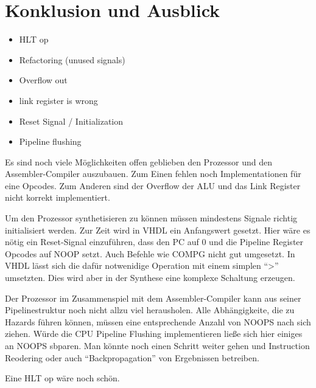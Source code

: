 \documentclass[paper=a4,fontsize=12pt,twocolumn]{scrreprt}
\begin{document}
\chapter{Konklusion und Ausblick}
\begin{itemize}
    \item HLT op
    \item Refactoring (unused signals)
    \item Overflow out
    \item link register is wrong
    \item Reset Signal / Initialization
    \item Pipeline flushing
\end{itemize}


Es sind noch viele Möglichkeiten offen geblieben den Prozessor und den Assembler-Compiler auszubauen.
Zum Einen fehlen noch Implementationen für eine Opcodes.
Zum Anderen sind der Overflow der ALU und das Link Register nicht korrekt implementiert.

Um den Prozessor synthetisieren zu können müssen mindestens Signale richtig initialisiert werden.
Zur Zeit wird in VHDL ein Anfangswert gesetzt.
Hier wäre es nötig ein Reset-Signal einzuführen, dass den PC auf 0 und die Pipeline Register Opcodes auf NOOP setzt.
Auch Befehle wie COMPG nicht gut umgesetzt.
In VHDL lässt sich die dafür notwenidige Operation mit einem simplen \enquote{>} umsetzten.
Dies wird aber in der Synthese eine komplexe Schaltung erzeugen.

Der Prozessor im Zusammenspiel mit dem Assembler-Compiler kann aus seiner Pipelinestruktur noch nicht allzu viel herausholen.
Alle Abhängigkeite, die zu Hazards führen können, müssen eine entsprechende Anzahl von NOOPS nach sich ziehen.
Würde die CPU Pipeline Flushing implementieren ließe sich hier einiges an NOOPS sbparen.
Man könnte noch einen Schritt weiter gehen und Instruction Reodering oder auch \enquote{Backpropagation} von Ergebnissen betreiben.

Eine HLT op wäre noch schön.

\kant[10-14]
\end{document}
